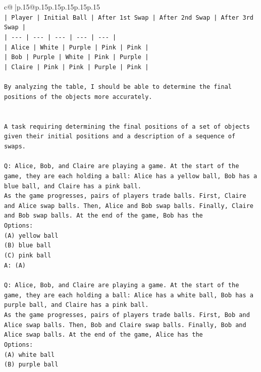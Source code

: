 \documentclass{article}
\begin{document}
{\begin{supertabular}{c@{$\;$}|p{.15\linewidth}@{}p{.15\linewidth}p{.15\linewidth}p{.15\linewidth}p{.15\linewidth}p{.15\linewidth}}
{{{\\ 
\texttt{| Player | Initial Ball | After 1st Swap | After 2nd Swap | After 3rd Swap |} \\
\texttt{| {-}{-}{-} | {-}{-}{-} | {-}{-}{-} | {-}{-}{-} | {-}{-}{-} |} \\
\texttt{| Alice | White | Purple | Pink | Pink |} \\
\texttt{| Bob | Purple | White | Pink | Purple |} \\
\texttt{| Claire | Pink | Pink | Purple | Pink |} \\
\\ 
\texttt{By analyzing the table, I should be able to determine the final positions of the objects more accurately.} \\
\\ 
\\ 
\texttt{A task requiring determining the final positions of a set of objects given their initial positions and a description of a sequence of swaps.} \\
\\ 
\texttt{Q: Alice, Bob, and Claire are playing a game. At the start of the game, they are each holding a ball: Alice has a yellow ball, Bob has a blue ball, and Claire has a pink ball.} \\
\texttt{As the game progresses, pairs of players trade balls. First, Claire and Alice swap balls. Then, Alice and Bob swap balls. Finally, Claire and Bob swap balls. At the end of the game, Bob has the} \\
\texttt{Options:} \\
\texttt{(A) yellow ball} \\
\texttt{(B) blue ball} \\
\texttt{(C) pink ball} \\
\texttt{A: (A)} \\
\\ 
\texttt{Q: Alice, Bob, and Claire are playing a game. At the start of the game, they are each holding a ball: Alice has a white ball, Bob has a purple ball, and Claire has a pink ball.} \\
\texttt{As the game progresses, pairs of players trade balls. First, Bob and Alice swap balls. Then, Bob and Claire swap balls. Finally, Bob and Alice swap balls. At the end of the game, Alice has the} \\
\texttt{Options:} \\
\texttt{(A) white ball} \\
\texttt{(B) purple ball} \\
}}}
\end{supertabular}}
\end{document}
